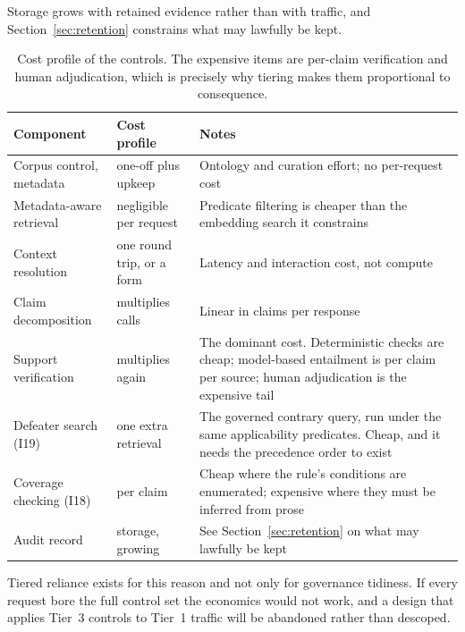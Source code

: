 Storage grows with retained evidence rather than with traffic, and
Section~\ref{sec:retention} constrains what may lawfully be kept.

\begin{table}[ht]
  \centering
  \small
  \begin{tabular}{@{}>{\raggedright\arraybackslash}p{3.9cm}>{\raggedright\arraybackslash}p{3.1cm}>{\raggedright\arraybackslash}p{6.6cm}@{}}
    \toprule
    Component & Cost profile & Notes \\
    \midrule
    Corpus control, metadata
      & one-off plus upkeep
      & Ontology and curation effort; no per-request cost \\
    \addlinespace
    Metadata-aware retrieval
      & negligible per request
      & Predicate filtering is cheaper than the embedding search it constrains \\
    \addlinespace
    Context resolution
      & one round trip, or a form
      & Latency and interaction cost, not compute \\
    \addlinespace
    Claim decomposition
      & multiplies calls
      & Linear in claims per response \\
    \addlinespace
    Support verification
      & multiplies again
      & The dominant cost. Deterministic checks are cheap; model-based
        entailment is per claim per source; human adjudication is the expensive tail \\
    \addlinespace
    Defeater search (I19)
      & one extra retrieval
      & The governed contrary query, run under the same applicability predicates.
        Cheap, and it needs the precedence order to exist \\
    \addlinespace
    Coverage checking (I18)
      & per claim
      & Cheap where the rule's conditions are enumerated; expensive where they must be
        inferred from prose \\
    \addlinespace
    Audit record
      & storage, growing
      & See Section~\ref{sec:retention} on what may lawfully be kept \\
    \bottomrule
  \end{tabular}
  \caption{Cost profile of the controls. The expensive items are per-claim
    verification and human adjudication, which is precisely why tiering
    makes them proportional to consequence.}
  \label{tab:cost}
\end{table}

Tiered reliance exists for this reason and not only for
governance tidiness. If every request bore the full control set the economics would
not work, and a design that applies Tier~3 controls to Tier~1 traffic will be
abandoned rather than descoped.

